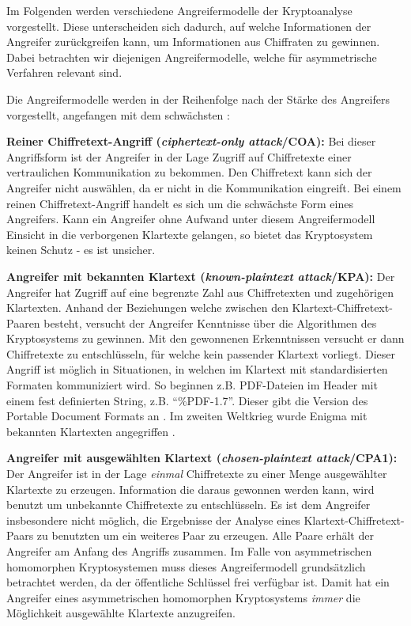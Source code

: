 Im Folgenden werden verschiedene Angreifermodelle der Kryptoanalyse vorgestellt. Diese unterscheiden sich dadurch, auf welche Informationen der Angreifer zurückgreifen kann, um Informationen aus Chiffraten zu gewinnen. Dabei betrachten wir diejenigen Angreifermodelle, welche für asymmetrische Verfahren relevant sind. %

Die Angreifermodelle werden in der Reihenfolge nach der Stärke des Angreifers vorgestellt, angefangen mit dem schwächsten \cite[p.4-5]{delfs2002introduction}\cite[p.7-8]{beutelspacher1995moderne}:

\textbf{Reiner Chiffretext-Angriff (\textit{ciphertext-only attack}/COA):}
Bei dieser Angriffsform ist der Angreifer in der Lage Zugriff auf Chiffretexte einer vertraulichen Kommunikation zu bekommen. Den Chiffretext kann sich der Angreifer nicht auswählen, da er nicht in die Kommunikation eingreift. Bei einem reinen Chiffretext-Angriff handelt es sich um die schwächste Form eines Angreifers. Kann ein Angreifer ohne Aufwand unter diesem Angreifermodell Einsicht in die verborgenen Klartexte gelangen, so bietet das Kryptosystem keinen Schutz - es ist unsicher.

\textbf{Angreifer mit bekannten Klartext (\textit{known-plaintext attack}/KPA):}
Der Angreifer hat Zugriff auf eine begrenzte Zahl aus Chiffretexten und zugehörigen Klartexten. Anhand der Beziehungen welche zwischen den Klartext-Chiffretext-Paaren besteht, versucht der Angreifer Kenntnisse über die Algorithmen des Kryptosystems zu gewinnen. Mit den gewonnenen Erkenntnissen versucht er dann Chiffretexte zu entschlüsseln, für welche kein passender Klartext vorliegt. Dieser Angriff ist möglich in Situationen, in welchen im Klartext mit standardisierten Formaten kommuniziert wird. So beginnen z.B. PDF-Dateien im Header mit einem fest definierten String, z.B. \enquote{\%PDF-1.7}. Dieser gibt die Version des Portable Document Formats an \cite[p.92]{pdfrefer40:online}. Im zweiten Weltkrieg wurde Enigma mit bekannten Klartexten angegriffen \cite{schneier2011secrets}.

\textbf{Angreifer mit ausgewählten Klartext (\textit{chosen-plaintext attack}/CPA1):}
Der Angreifer ist in der Lage \textit{einmal} Chiffretexte zu einer Menge ausgewählter Klartexte zu erzeugen. Information die daraus gewonnen werden kann, wird benutzt um unbekannte Chiffretexte zu entschlüsseln. Es ist dem Angreifer insbesondere nicht möglich, die Ergebnisse der Analyse eines Klartext-Chiffretext-Paars zu benutzten um ein weiteres Paar zu erzeugen. Alle Paare erhält der Angreifer am Anfang des Angriffs zusammen. Im Falle von asymmetrischen homomorphen Kryptosystemen muss dieses Angreifermodell grundsätzlich betrachtet werden, da der öffentliche Schlüssel frei verfügbar ist. Damit hat ein Angreifer eines asymmetrischen homomorphen Kryptosystems \textit{immer} die Möglichkeit ausgewählte Klartexte anzugreifen. 

